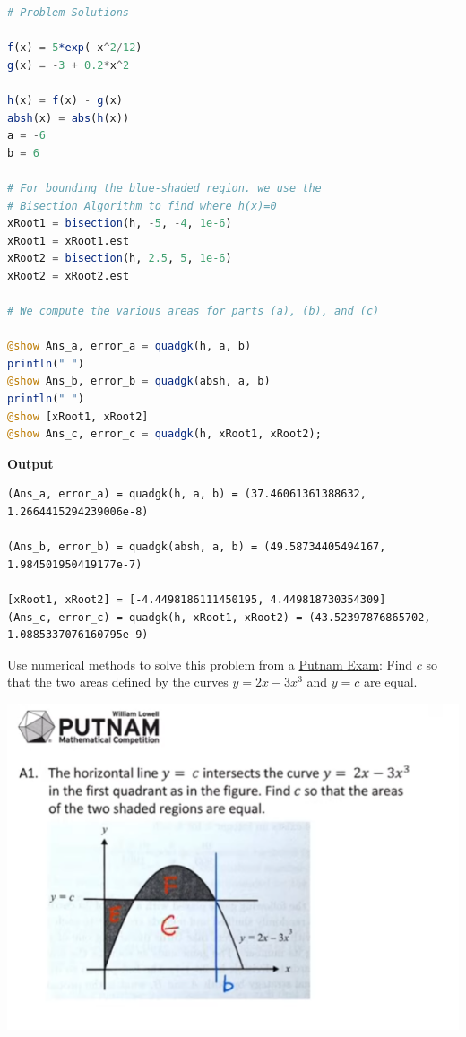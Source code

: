 \begin{lstlisting}[language=Julia,style=mystyle]
# Problem Solutions

f(x) = 5*exp(-x^2/12)
g(x) = -3 + 0.2*x^2

h(x) = f(x) - g(x)
absh(x) = abs(h(x))
a = -6
b = 6

# For bounding the blue-shaded region. we use the 
# Bisection Algorithm to find where h(x)=0
xRoot1 = bisection(h, -5, -4, 1e-6)
xRoot1 = xRoot1.est
xRoot2 = bisection(h, 2.5, 5, 1e-6)
xRoot2 = xRoot2.est

# We compute the various areas for parts (a), (b), and (c)

@show Ans_a, error_a = quadgk(h, a, b)
println(" ")
@show Ans_b, error_b = quadgk(absh, a, b)
println(" ")
@show [xRoot1, xRoot2]
@show Ans_c, error_c = quadgk(h, xRoot1, xRoot2);
\end{lstlisting}
\textbf{Output} 
\begin{verbatim}
(Ans_a, error_a) = quadgk(h, a, b) = (37.46061361388632, 1.2664415294239006e-8)

(Ans_b, error_b) = quadgk(absh, a, b) = (49.58734405494167, 1.984501950419177e-7)

[xRoot1, xRoot2] = [-4.4498186111450195, 4.449818730354309]
(Ans_c, error_c) = quadgk(h, xRoot1, xRoot2) = (43.52397876865702, 1.0885337076160795e-9)
\end{verbatim}



\Qed

\bigskip

\begin{example} Use numerical methods to solve this problem from a \href{https://youtu.be/W85Q0AUuV14}{Putnam Exam}: Find $c$ so that the two areas defined by the curves $y=2x - 3 x^3$ and $y=c$ are equal.\\

\begin{center}
\includegraphics[width=0.6\columnwidth]{graphics/Chap03/PutnamAreaQuestion.png}%
\end{center}
\end{example}


